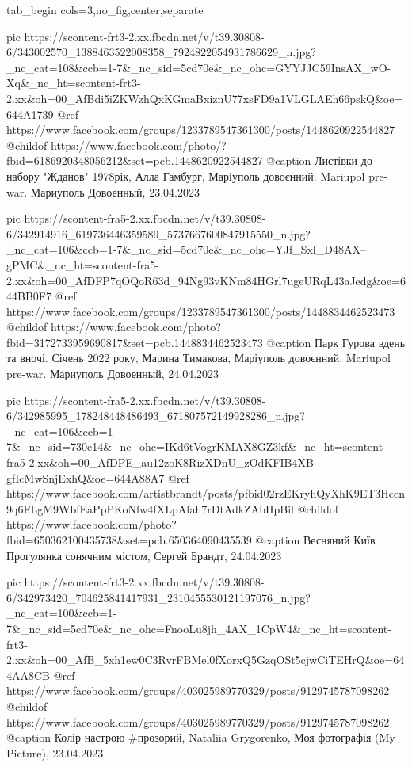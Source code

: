  
 
 
 
 


\ifcmt
  tab_begin cols=3,no_fig,center,separate

     pic https://scontent-frt3-2.xx.fbcdn.net/v/t39.30808-6/343002570_1388463522008358_7924822054931786629_n.jpg?_nc_cat=108&ccb=1-7&_nc_sid=5cd70e&_nc_ohc=GYYJJC59InsAX_wO-Xq&_nc_ht=scontent-frt3-2.xx&oh=00_AfBdi5iZKWzhQxKGmaBxiznU77xsFD9a1VLGLAEh66pskQ&oe=644A1739
     @ref https://www.facebook.com/groups/1233789547361300/posts/1448620922544827
     @childof https://www.facebook.com/photo/?fbid=6186920348056212&set=pcb.1448620922544827
     @caption Листівки до набору "Жданов" 1978рік, Алла Гамбург, Маріуполь довоєнний. Mariupol pre-war. Мариуполь Довоенный, 23.04.2023

     pic https://scontent-fra5-2.xx.fbcdn.net/v/t39.30808-6/342914916_619736446359589_5737667600847915550_n.jpg?_nc_cat=106&ccb=1-7&_nc_sid=5cd70e&_nc_ohc=YJf_Sxl_D48AX--gPMC&_nc_ht=scontent-fra5-2.xx&oh=00_AfDFP7qOQoR63d_94Ng93vKNm84HGrl7ugeURqL43aJedg&oe=644BB0F7
     @ref https://www.facebook.com/groups/1233789547361300/posts/1448834462523473
     @childof https://www.facebook.com/photo?fbid=3172733959690817&set=pcb.1448834462523473
     @caption Парк Гурова вдень та вночі. Січень 2022 року, Марина Тимакова, Маріуполь довоєнний. Mariupol pre-war. Мариуполь Довоенный, 24.04.2023

     pic https://scontent-fra5-2.xx.fbcdn.net/v/t39.30808-6/342985995_178248448486493_671807572149928286_n.jpg?_nc_cat=106&ccb=1-7&_nc_sid=730e14&_nc_ohc=IKd6tVogrKMAX8GZ3kf&_nc_ht=scontent-fra5-2.xx&oh=00_AfDPE_au12zoK8RizXDnU_zOdKFIB4XB-gfIcMwSnjExhQ&oe=644A88A7
     @ref https://www.facebook.com/artistbrandt/posts/pfbid02rzEKryhQyXhK9ET3Hccn9q6FLgM9WbfEaPpPKoNfw4fXLpAfah7rDtAdkZAbHpBil
     @childof https://www.facebook.com/photo?fbid=650362100435738&set=pcb.650364090435539
     @caption Весняний Київ Прогулянка сонячним містом, Сергей Брандт, 24.04.2023

     pic https://scontent-frt3-2.xx.fbcdn.net/v/t39.30808-6/342973420_704625841417931_2310455530121197076_n.jpg?_nc_cat=100&ccb=1-7&_nc_sid=5cd70e&_nc_ohc=FnooLu8jh_4AX_1CpW4&_nc_ht=scontent-frt3-2.xx&oh=00_AfB_5xh1ew0C3RvrFBMel0fXorxQ5GzqOSt5cjwCiTEHrQ&oe=644AA8CB
     @ref https://www.facebook.com/groups/403025989770329/posts/9129745787098262
     @childof https://www.facebook.com/groups/403025989770329/posts/9129745787098262
     @caption Колір настрою #прозорий, Nataliia Grygorenko, Моя фотографія (My Picture), 23.04.2023

